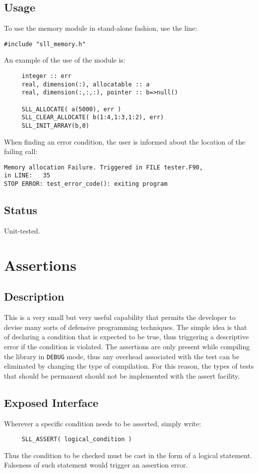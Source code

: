 \documentclass[]{report}   %
\begin{document}
\subsection{Usage}

To use the memory module in stand-alone fashion, use the line:
\begin{verbatim}
#include "sll_memory.h"
\end{verbatim}
An example of the use of the module is:
\begin{verbatim}
     integer :: err
     real, dimension(:), allocatable :: a
     real, dimension(:,:,:), pointer :: b=>null()

     SLL_ALLOCATE( a(5000), err )
     SLL_CLEAR_ALLOCATE( b(1:4,1:3,1:2), err)
     SLL_INIT_ARRAY(b,0)
\end{verbatim}

When finding an error condition, the user is informed about the location of the failing call:

\begin{verbatim}
Memory allocation Failure. Triggered in FILE tester.F90, 
in LINE:   35
STOP ERROR: test_error_code(): exiting program
\end{verbatim}

\subsection{Status}
Unit-tested.

\section{Assertions}
\subsection{Description}
This is a very small but very useful capability that permits the developer to devise many sorts of defensive programming techniques. The simple idea is that of declaring a condition that is expected to be true, thus triggering a descriptive error if the condition is violated. The assertions are only present while compiling the library in \verb+DEBUG+ mode, thus any overhead associated with the test can be eliminated by changing the type of compilation. For this reason, the types of tests that should be permanent should not be implemented with the assert facility.

\subsection{Exposed Interface}
Wherever a specific condition needs to be asserted, simply write:
\begin{verbatim}
     SLL_ASSERT( logical_condition )
\end{verbatim}
Thus the condition to be checked must be cast in the form of a logical statement. Falseness of such statement would trigger an assertion error.
\end{document}
